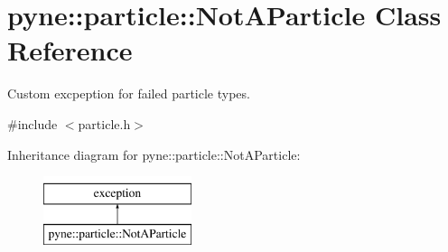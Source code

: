 \hypertarget{classpyne_1_1particle_1_1_not_a_particle}{}\section{pyne\+:\+:particle\+:\+:Not\+A\+Particle Class Reference}
\label{classpyne_1_1particle_1_1_not_a_particle}


Custom excpeption for failed particle types.  




{\ttfamily \#include $<$particle.\+h$>$}

Inheritance diagram for pyne\+:\+:particle\+:\+:Not\+A\+Particle\+:\begin{figure}[H]
\begin{center}
\leavevmode
\includegraphics[height=2.000000cm]{classpyne_1_1particle_1_1_not_a_particle}
\end{center}
\end{figure}

